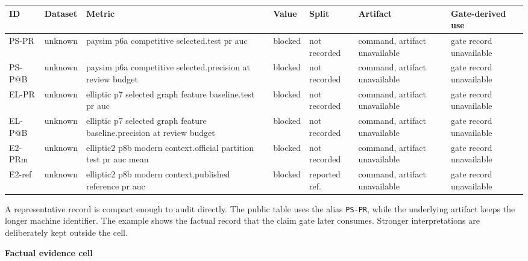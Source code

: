 \documentclass[11pt]{article}
\begin{document}
\begin{center}
\begin{minipage}{\linewidth}
\scriptsize
\setlength{\tabcolsep}{3pt}
\renewcommand{\arraystretch}{1.16}
\begin{tabularx}{\linewidth}{@{}>{\raggedright\arraybackslash}X >{\raggedright\arraybackslash}X >{\raggedright\arraybackslash}X >{\raggedleft\arraybackslash}X >{\raggedright\arraybackslash}X >{\raggedright\arraybackslash}X >{\raggedright\arraybackslash}X@{}}
\toprule
ID & Dataset & Metric & Value & Split & Artifact & Gate-derived use \\
\midrule
PS-PR & unknown & paysim p6a competitive selected.test pr auc & blocked & not recorded & command, artifact unavailable & gate record unavailable \\
PS-P@B & unknown & paysim p6a competitive selected.precision at review budget & blocked & not recorded & command, artifact unavailable & gate record unavailable \\
EL-PR & unknown & elliptic p7 selected graph feature baseline.test pr auc & blocked & not recorded & command, artifact unavailable & gate record unavailable \\
EL-P@B & unknown & elliptic p7 selected graph feature baseline.precision at review budget & blocked & not recorded & command, artifact unavailable & gate record unavailable \\
E2-PRm & unknown & elliptic2 p8b modern context.official partition test pr auc mean & blocked & not recorded & command, artifact unavailable & gate record unavailable \\
E2-ref & unknown & elliptic2 p8b modern context.published reference pr auc & blocked & reported ref. & command, artifact unavailable & gate record unavailable \\
\bottomrule
\end{tabularx}
\end{minipage}
\end{center}


A representative record is compact enough to audit directly. The public table uses the alias \nolinkurl{PS-PR}, while the underlying artifact keeps the longer machine identifier. The example shows the factual record that the claim gate later consumes. Stronger interpretations are deliberately kept outside the cell.

\textbf{Factual evidence cell}
\end{document}
